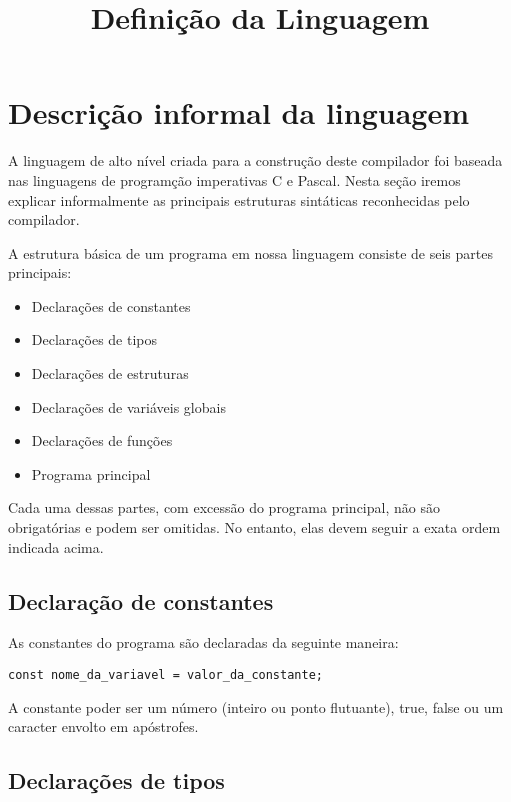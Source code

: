 \documentclass[12pt,oneside,a4paper,english]{abntex2}
\title{Definição da Linguagem}
\begin{document}
\frenchspacing %

\imprimirfolhaderosto

\clearpage

\textual

\chapter{Descrição informal da linguagem}

  A linguagem de alto nível criada para a construção deste compilador foi baseada nas linguagens de programção imperativas C e Pascal. Nesta seção iremos explicar informalmente as principais estruturas sintáticas reconhecidas pelo compilador.

  A estrutura básica de um programa em nossa linguagem consiste de seis partes principais:

  \begin{itemize}
    \item Declarações de constantes
    \item Declarações de tipos
    \item Declarações de estruturas
    \item Declarações de variáveis globais
    \item Declarações de funções
    \item Programa principal
  \end{itemize}

  Cada uma dessas partes, com excessão do programa principal, não são obrigatórias e podem ser omitidas. No entanto, elas devem seguir a exata ordem indicada acima.

  \section{Declaração de constantes}

  As constantes do programa são declaradas da seguinte maneira:

\begin{lstlisting}
const nome_da_variavel = valor_da_constante;
\end{lstlisting}

  A constante poder ser um número (inteiro ou ponto flutuante), true, false ou um caracter envolto em apóstrofes.

  \section{Declarações de tipos}
\end{document}
